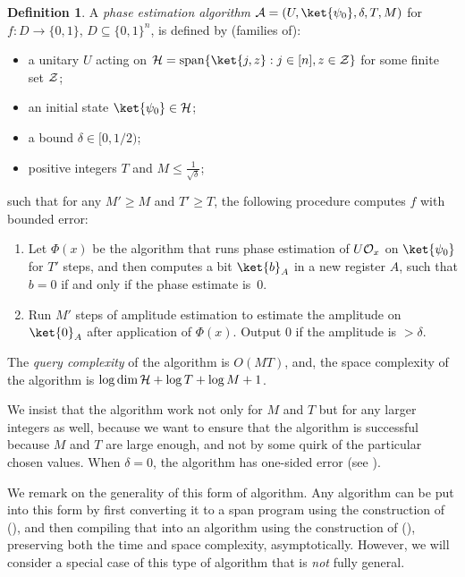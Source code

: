 \documentclass[11pt]{article}
\numberwithin{equation}{section}
\theoremstyle{definition}
\newtheorem{definition}[theorem]{Definition}
\theoremstyle{plain}
\begin{document}
\begin{definition}\label{def:phase-estimation-alg}
A \emph{phase estimation algorithm} ${\cal A}=(U,\ket{\psi_0},\delta,T,M)$ for $f:D\rightarrow\{0,1\}$, $D\subseteq\{0,1\}^n$, is defined by (families of):
\begin{itemize}
\item a unitary $U$ acting on ${\cal H}=\mathrm{span}\{\ket{j,z}:j\in [n],z\in{\cal Z}\}$ for some finite set ${\cal Z}$;
\item an initial state $\ket{\psi_0}\in {\cal H}$;
\item a bound $\delta\in [0,1/2)$;
\item positive integers $T$ and $M\leq \frac{1}{\sqrt{\delta}}$;
\end{itemize}
such that for any $M'\geq M$ and $T'\geq T$, the following procedure computes $f$ with bounded error:
\begin{enumerate}
\item Let $\Phi(x)$ be the algorithm that runs phase estimation of $U{\cal O}_x$ on $\ket{\psi_0}$ for $T'$ steps, and then computes a bit $\ket{b}_A$ in a new register $A$, such that $b=0$ if and only if the phase estimate is~$0$.
\item Run $M'$ steps of amplitude estimation to estimate the amplitude on $\ket{0}_A$ after application of $\Phi(x)$. Output $0$ if the amplitude is $> {\delta}$.
\end{enumerate}
The \emph{query complexity} of the algorithm is $O(MT)$, and, the space complexity of the algorithm is $\log \dim {\cal H}+\log T+\log M+1$. 
\end{definition}

We insist that the algorithm work not only for $M$ and $T$ but for any larger integers as well, because we want to ensure that the algorithm is successful because $M$ and $T$ are large enough, and not by some quirk of the particular chosen values. When $\delta=0$, the algorithm has one-sided error (see ).

We remark on the generality of this form of algorithm. Any algorithm can be put into this form by first converting it to a span program using the construction of  (), and then compiling that into an algorithm using the construction of  (), preserving both the time and space complexity, asymptotically. However, we will consider a special case of this type of algorithm that is \emph{not} fully general. 
\end{document}
